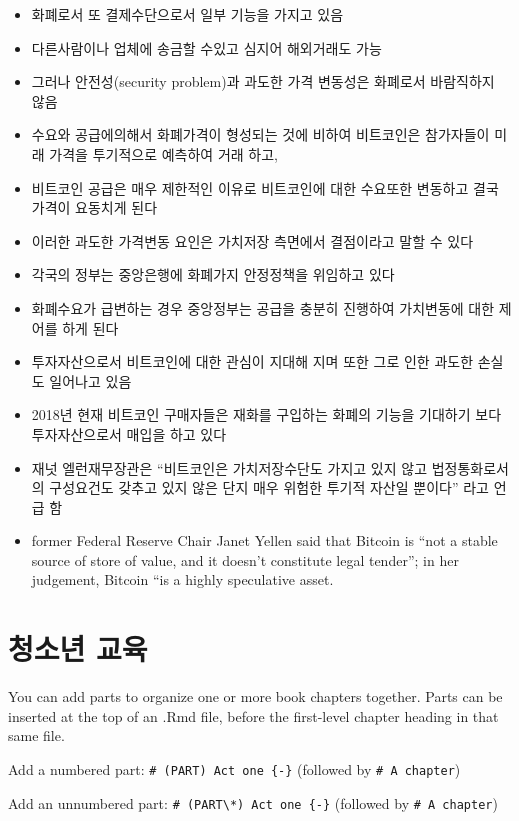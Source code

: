 \documentclass[
]{book}
\providecommand{\tightlist}{%
  \setlength{\itemsep}{0pt}\setlength{\parskip}{0pt}}
\begin{document}
\begin{itemize}
\tightlist
\item
  화폐로서 또 결제수단으로서 일부 기능을 가지고 있음
\item
  다른사람이나 업체에 송금할 수있고 심지어 해외거래도 가능
\item
  그러나 안전성(security problem)과 과도한 가격 변동성은 화폐로서 바람직하지 않음
\item
  수요와 공급에의해서 화폐가격이 형성되는 것에 비하여 비트코인은 참가자들이 미래 가격을 투기적으로 예측하여 거래 하고,
\item
  비트코인 공급은 매우 제한적인 이유로 비트코인에 대한 수요또한 변동하고 결국 가격이 요동치게 된다
\item
  이러한 과도한 가격변동 요인은 가치저장 측면에서 결점이라고 말할 수 있다
\item
  각국의 정부는 중앙은행에 화폐가지 안정정책을 위임하고 있다
\item
  화폐수요가 급변하는 경우 중앙정부는 공급을 충분히 진행하여 가치변동에 대한 제어를 하게 된다
\item
  투자자산으로서 비트코인에 대한 관심이 지대해 지며 또한 그로 인한 과도한 손실도 일어나고 있음
\item
  2018년 현재 비트코인 구매자들은 재화를 구입하는 화폐의 기능을 기대하기 보다 투자자산으로서 매입을 하고 있다
\item
  재넛 엘런재무장관은 ``비트코인은 가치저장수단도 가지고 있지 않고 법정통화로서의 구성요건도 갖추고 있지 않은 단지 매우 위험한 투기적 자산일 뿐이다'' 라고 언급 함
\item
  former Federal Reserve Chair Janet Yellen said that Bitcoin is ``not a stable source of store of value, and it doesn't constitute legal tender''; in her judgement, Bitcoin ``is a highly speculative asset.
\end{itemize}

\hypertarget{uxccaduxc18cuxb144-uxad50uxc721}{%
\chapter{청소년 교육}\label{uxccaduxc18cuxb144-uxad50uxc721}}

You can add parts to organize one or more book chapters together. Parts can be inserted at the top of an .Rmd file, before the first-level chapter heading in that same file.

Add a numbered part: \texttt{\#\ (PART)\ Act\ one\ \{-\}} (followed by \texttt{\#\ A\ chapter})

Add an unnumbered part: \texttt{\#\ (PART\textbackslash{}*)\ Act\ one\ \{-\}} (followed by \texttt{\#\ A\ chapter})
\end{document}
